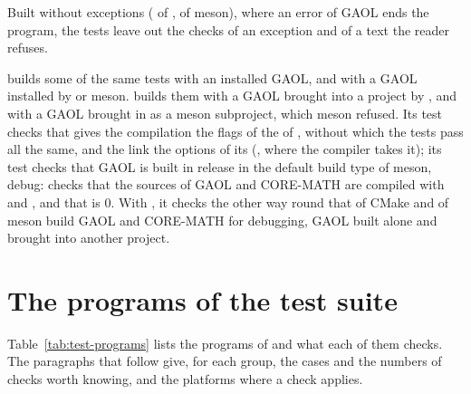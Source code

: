 \documentclass[12pt,a4paper,twoside,openright]{book}
\begin{document}
\begin{Rem}
Built without exceptions ( of ,
 of meson), where an error of GAOL ends the
program, the tests leave out the checks of an exception and of a text the
reader refuses.\newinvfive
\end{Rem}

\medskip
{} builds some of the same tests with an installed
GAOL, and  with a GAOL installed by
 or meson.  builds them with a GAOL
brought into a project by , and
 with a GAOL brought in as a meson
subproject,\newinvfive{} which meson refused. Its test  checks
that  gives the compilation the flags of the  of
, without which the tests pass all the same, and the link the
options of its  (, where the compiler takes
it); its test  checks that GAOL is built in release in the
default build type of meson, debug:  checks
that the sources of GAOL and CORE-MATH are compiled with  and
, and that  is 0. With ,
it checks the other way round that  of CMake and
 of meson build GAOL and CORE-MATH for debugging, GAOL
built alone and brought into another project.

\section{The programs of the test suite}\label{sec:test-programs}
%

Table~\ref{tab:test-programs} lists the programs of  and what
each of them checks. The paragraphs that follow give, for each group, the
cases and the numbers of checks worth knowing, and the platforms where a
check applies.
\end{document}
